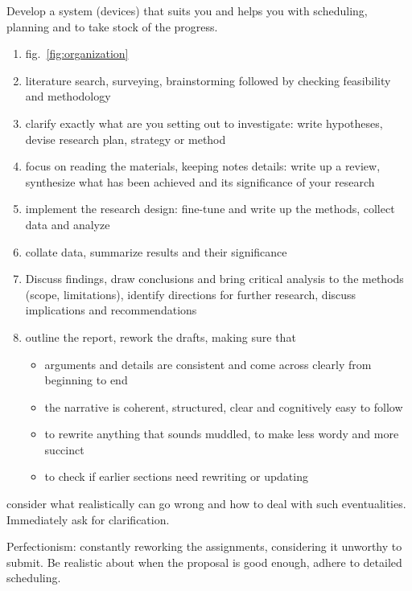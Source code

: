 \documentclass[10pt,a4paper,twocolumn]{article}
\begin{document}
Develop a system (devices) that suits you and helps you with scheduling, planning and to
take stock of the progress.
\begin{enumerate}
  \item fig.~\ref{fig:organization}
  \item literature search, surveying, brainstorming followed by checking feasibility
  and methodology
  \item clarify exactly what are you setting out to investigate: write hypotheses, devise
  research plan, strategy or method
  \item focus on reading the materials, keeping notes details: write up a review, synthesize
  what has been achieved and its significance of your research
  \item implement the research design: fine-tune and write up the methods, collect data
  and analyze
  \item collate data, summarize results and their significance
  \item Discuss findings, draw conclusions and bring critical analysis to the methods
  (scope, limitations), identify directions for further research, discuss implications and
  recommendations
  \item outline the report, rework the drafts, making sure that
  \begin{itemize}
    \item arguments and details are consistent and come across clearly from beginning to end
    \item the narrative is coherent, structured, clear and cognitively easy to follow
    \item to rewrite anything that sounds muddled, to make less wordy and more succinct
    \item to check if earlier sections need rewriting or updating
  \end{itemize}
\end{enumerate}

consider what realistically can go wrong and how to deal with such eventualities.
Immediately ask for clarification.

Perfectionism: constantly reworking the assignments, considering it unworthy to submit.
Be realistic about when the proposal is good enough, adhere to detailed scheduling.
\end{document}

